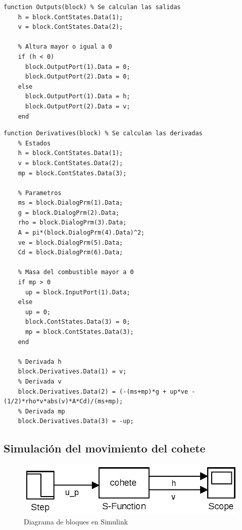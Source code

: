 \documentclass[12pt,letterpaper]{article}
\begin{document}
\begin{lstlisting}[style=Matlab-editor, basicstyle=\mlttfamily]
  function Outputs(block) % Se calculan las salidas
    h = block.ContStates.Data(1);
    v = block.ContStates.Data(2);

    % Altura mayor o igual a 0
    if (h < 0)
      block.OutputPort(1).Data = 0;
      block.OutputPort(2).Data = 0;
    else
      block.OutputPort(1).Data = h;
      block.OutputPort(2).Data = v;
    end
\end{lstlisting}

\begin{lstlisting}[style=Matlab-editor, basicstyle=\mlttfamily]
  function Derivatives(block) % Se calculan las derivadas
    % Estados
    h = block.ContStates.Data(1);
    v = block.ContStates.Data(2);
    mp = block.ContStates.Data(3);

    % Parametros
    ms = block.DialogPrm(1).Data;
    g = block.DialogPrm(2).Data;
    rho = block.DialogPrm(3).Data;
    A = pi*(block.DialogPrm(4).Data)^2;
    ve = block.DialogPrm(5).Data;
    Cd = block.DialogPrm(6).Data;

    % Masa del combustible mayor a 0
    if mp > 0
      up = block.InputPort(1).Data;
    else
      up = 0;
      block.ContStates.Data(3) = 0;
      mp = block.ContStates.Data(3);
    end

    % Derivada h
    block.Derivatives.Data(1) = v;
    % Derivada v
    block.Derivatives.Data(2) = (-(ms+mp)*g + up*ve -(1/2)*rho*v*abs(v)*A*Cd)/(ms+mp);
    % Derivada mp
    block.Derivatives.Data(3) = -up;     
\end{lstlisting}



\subsection{Simulación del movimiento del cohete}


\begin{figure}[ht!]
  \centering
  \includegraphics[width=0.5\linewidth]{pictures/Ejercicio3/simulink_cohete.eps}
  \caption{Diagrama de bloques en Simulink}
\end{figure}
\end{document}

